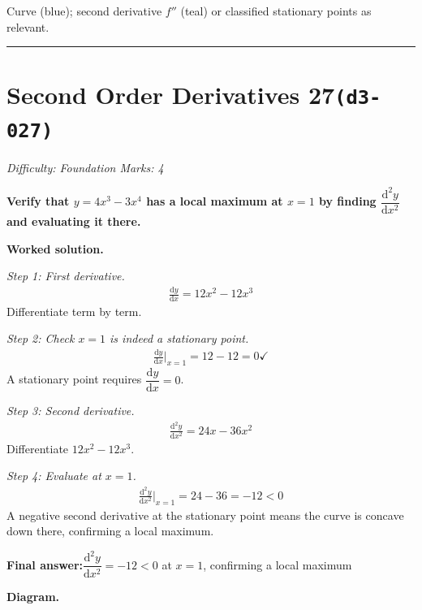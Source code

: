 \documentclass[11pt]{article}
\newcommand{\question}[1]{\par\medskip\noindent\textbf{#1}\par}
\begin{document}
\small Curve (blue); second derivative $f''$ (teal) or classified stationary points as relevant.\normalsize

\medskip\hrule

\section*{Second Order Derivatives 27\quad\small\texttt{(d3-027)}}
\textit{Difficulty: Foundation \quad\textbar\quad Marks: 4}

\question{Verify that \( y = 4x^3 - 3x^4 \) has a local maximum at \( x = 1 \) by finding \( \dfrac{\mathrm{d}^2y}{\mathrm{d}x^2} \) and evaluating it there.}

\textbf{Worked solution.}

\textit{Step 1: First derivative.}
\[\begin{gathered}
\frac{\mathrm{d}y}{\mathrm{d}x} = 12x^2 - 12x^3
\end{gathered}\]
Differentiate term by term.

\textit{Step 2: Check \( x = 1 \) is indeed a stationary point.}
\[\begin{gathered}
\frac{\mathrm{d}y}{\mathrm{d}x}\bigg|_{x=1} = 12 - 12 = 0 \checkmark
\end{gathered}\]
A stationary point requires \( \dfrac{\mathrm{d}y}{\mathrm{d}x} = 0 \).

\textit{Step 3: Second derivative.}
\[\begin{gathered}
\frac{\mathrm{d}^2y}{\mathrm{d}x^2} = 24x - 36x^2
\end{gathered}\]
Differentiate \(12x^2 - 12x^3\).

\textit{Step 4: Evaluate at \( x = 1 \).}
\[\begin{gathered}
\frac{\mathrm{d}^2y}{\mathrm{d}x^2}\bigg|_{x=1} = 24 - 36 = -12 < 0
\end{gathered}\]
A negative second derivative at the stationary point means the curve is concave down there, confirming a local maximum.

\begin{answerbox}
\textbf{Final answer:}\quad \(\displaystyle  \dfrac{\mathrm{d}^2y}{\mathrm{d}x^2} = -12 < 0 \) at \(\displaystyle  x = 1 \), confirming a local maximum
\end{answerbox}
\textbf{Diagram.}
\end{document}
